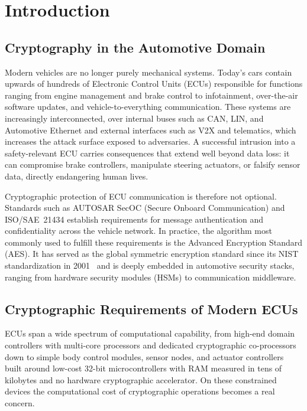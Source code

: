 \chapter{Introduction}

\section{Cryptography in the Automotive Domain}

Modern vehicles are no longer purely mechanical systems.
Today's cars contain upwards of hundreds of Electronic Control Units (ECUs)
responsible for functions ranging from engine management and brake control to
infotainment, over-the-air software updates, and vehicle-to-everything
communication.
These systems are increasingly interconnected, over internal buses such as CAN,
LIN, and Automotive Ethernet and external interfaces such as V2X and telematics,
which increases the attack surface exposed to adversaries.
A successful intrusion into a safety-relevant ECU carries consequences that
extend well beyond data loss: it can compromise brake controllers, manipulate
steering actuators, or falsify sensor data, directly endangering human lives.

Cryptographic protection of ECU communication is therefore not optional.
Standards such as AUTOSAR SecOC (Secure Onboard Communication) and
ISO/SAE~21434 establish requirements for message authentication and
confidentiality across the vehicle network.
In practice, the algorithm most commonly used to fulfill these requirements is
the Advanced Encryption Standard (AES).
It has served as the global symmetric encryption standard since its NIST
standardization in 2001~\cite{FIPS197} and is deeply embedded in automotive
security stacks, ranging from hardware security modules (HSMs) to communication
middleware.

\section{Cryptographic Requirements of Modern ECUs}

ECUs span a wide spectrum of computational capability, from high-end domain
controllers with multi-core processors and dedicated cryptographic co-processors
down to simple body control modules, sensor nodes, and actuator controllers
built around low-cost 32-bit microcontrollers with RAM measured in tens of
kilobytes and no hardware cryptographic accelerator.
On these constrained devices the computational cost of cryptographic operations
becomes a real concern.

